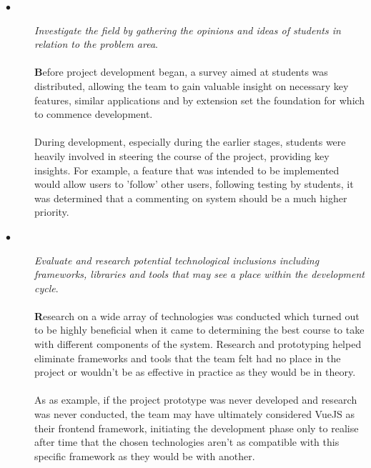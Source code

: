 \begin{description}
  \item[$\bullet$] \textit{Investigate the field by gathering the opinions and ideas of students in relation to the problem area}. 
  
  \paragraph{}
  \textbf{B}efore project development began, a survey aimed at students was distributed, allowing the team to gain valuable insight on necessary key features, similar applications and by extension set the foundation for which to commence development. 
  
  \paragraph{}
  During development, especially during the earlier stages, students were heavily involved in steering the course of the project, providing key insights. For example, a feature that was intended to be implemented would allow users to 'follow' other users, following testing by students, it was determined that a commenting on system should be a much higher priority.

  \item[$\bullet$] \textit{Evaluate and research potential technological inclusions including frameworks, libraries and tools that may see a place within the development cycle}.
  
  \paragraph{}
  \textbf{R}esearch on a wide array of technologies was conducted which turned out to be highly beneficial  when it came to determining the best course to take with different components of the system. Research and prototyping helped eliminate frameworks and tools that the team felt had no place in the project or wouldn't be as effective in practice as they would be in theory.
  
  \paragraph{}
  As as example, if the project prototype was never developed and research was never conducted, the team may have ultimately considered VueJS as their frontend framework, initiating the development phase only to realise after time that the chosen technologies aren't as compatible with this specific framework as they would be with another. 
  

\end{description}

